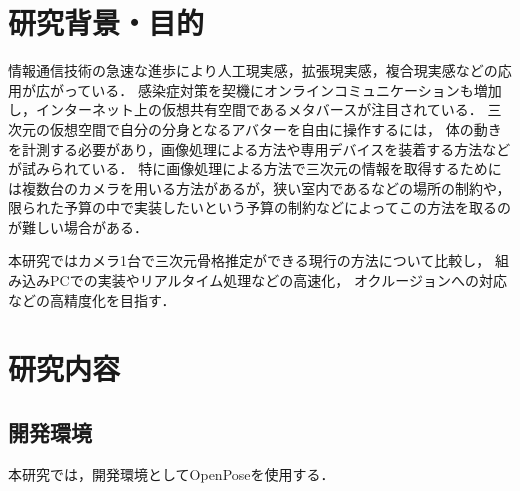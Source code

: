 \documentclass[titlepage]{jarticle}
\begin{document}
\maketitle

%
%
\section{研究背景・目的}
%
情報通信技術の急速な進歩により人工現実感，拡張現実感，複合現実感などの応用が広がっている．
感染症対策を契機にオンラインコミュニケーションも増加し，インターネット上の仮想共有空間であるメタバースが注目されている．
三次元の仮想空間で自分の分身となるアバターを自由に操作するには，
体の動きを計測する必要があり，画像処理による方法や専用デバイスを装着する方法などが試みられている．
特に画像処理による方法で三次元の情報を取得するためには複数台のカメラを用いる方法があるが，狭い室内であるなどの場所の制約や，
限られた予算の中で実装したいという予算の制約などによってこの方法を取るのが難しい場合がある．

本研究ではカメラ1台で三次元骨格推定ができる現行の方法について比較し，
組み込みPCでの実装やリアルタイム処理などの高速化，
オクルージョンへの対応などの高精度化を目指す．
%
%
\section{研究内容}
%

%
%
\subsection{開発環境}
%
本研究では，開発環境としてOpenPoseを使用する．
%
%
\end{document}
